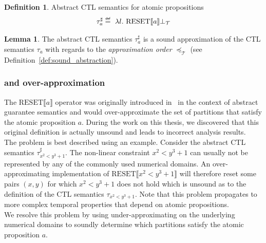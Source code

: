 \documentclass[11pt,a4paper,titlepage]{article}
\theoremstyle{definition}
\newtheorem{definition}{Definition}[section]
\newtheorem{lemma}[theorem]{Lemma}
\newcommand\eqdef{\mathrel{\overset{\makebox[0pt]{\mbox{\normalfont\tiny\sffamily def}}}{=}}}
\begin{document}
\begin{definition}\label{def:abstract_ctl_semantics_atomic}
    Abstract CTL semantics for atomic propositions
    \begin{align}
        \tau^{\sharp}_{a} \eqdef \ \lambda l. \ \text{RESET} \llbracket a \rrbracket \bot_\mathcal{T}
    \end{align}
\end{definition}

\begin{lemma}
    The abstract CTL semantics $\tau^{\sharp}_{a}$ is a sound approximation of the
    CTL semantics $\tau_{a}$ with regards to the \textit{approximation order} $\preceq_\mathcal{T}$ (see Definition~\ref{def:sound_abstraction}).
\end{lemma}


\begin{tcolorbox}
    \subsubsection*{ and over-approximation}

    The $\text{RESET}\llbracket a \rrbracket$ operator was originally introduced in~\cite{UrbanPhd} in the context of abstract guarantee semantics
    and would over-approximate the set of partitions that satisfy the atomic proposition $a$. 
    During the work on this thesis, we discovered that this original definition is actually unsound and leads to incorrect analysis results.\\
    
    The problem is best described using an example. Consider the abstract CTL semantics $\tau^{\sharp}_{x^2 < y^3 + 1}$. 
    The non-linear constraint $x^2 < y^3 + 1$ can usually not be represented by any of the commonly used numerical domains. 
    An over-approximating implementation of $\text{RESET}\llbracket x^2 < y^3 + 1 \rrbracket$ will therefore
    reset some pairs $(x, y)$ for which $x^2 < y^3 + 1$ does not hold which is unsound as to the definition of
    the CTL semantics $\tau_{x^2 < y^3 + 1}$. Note that this problem propagates to more complex temporal properties that
    depend on atomic propositions.\\

    We resolve this problem by using under-approximating on the underlying numerical domains to soundly determine which partitions 
    satisfy the atomic proposition $a$. 
\end{tcolorbox}
\end{document}
